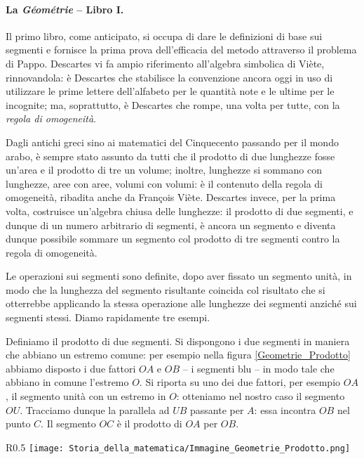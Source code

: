 \paragraph{La \textit{G\'eom\'etrie} -- Libro I.} Il primo libro, come anticipato, si occupa di dare le definizioni di base sui segmenti e fornisce la prima prova dell'efficacia del metodo attraverso il problema di Pappo. Descartes vi fa ampio riferimento all'algebra simbolica di Vi\`ete, rinnovandola: \`e Descartes che stabilisce la convenzione ancora oggi in uso di utilizzare le prime lettere dell'alfabeto per le quantit\`a note e le ultime per le incognite; ma, soprattutto, \`e Descartes che rompe, una volta per tutte, con la \textit{regola di omogeneit\`a}.
\par Dagli antichi greci sino ai matematici del Cinquecento passando per il mondo arabo, \`e sempre stato assunto da tutti che il prodotto di due lunghezze fosse un'area e il prodotto di tre un volume; inoltre, lunghezze si sommano con lunghezze, aree con aree, volumi con volumi: \`e il contenuto della regola di omogeneit\`a, ribadita anche da Fran\c{c}ois Vi\`ete. Descartes invece, per la prima volta, costruisce un'algebra chiusa delle lunghezze: il prodotto di due segmenti, e dunque di un numero arbitrario di segmenti, \`e ancora un segmento e diventa dunque possibile sommare un segmento col prodotto di tre segmenti contro la regola di omogeneit\`a.
\par Le operazioni sui segmenti sono definite, dopo aver fissato un segmento unit\`a, in modo che la lunghezza del segmento risultante coincida col risultato che si otterrebbe applicando la stessa operazione alle lunghezze dei segmenti anzich\'e sui segmenti stessi. Diamo rapidamente tre esempi.
\par Definiamo il prodotto di due segmenti. Si dispongono i due segmenti in maniera che abbiano un estremo comune: per esempio nella figura \ref{Geometrie_Prodotto} abbiamo disposto i due fattori $OA$ e $OB$ -- i segmenti blu -- in modo tale che abbiano in comune l'estremo $O$. Si riporta su uno dei due fattori, per esempio $OA$, il segmento unit\`a con un estremo in $O$: otteniamo nel nostro caso il segmento $OU$. Tracciamo dunque la parallela ad $UB$ passante per $A$: essa incontra $OB$ nel punto $C$. Il segmento $OC$ \`e il prodotto di $OA$ per $OB$.
\begin{wrapfigure}{R}{0.5\textwidth}
	\texttt{[image: Storia\_della\_matematica/Immagine\_Geometrie\_Prodotto.png]}
	\caption{Definizione del prodotto di due segmenti.}
	\label{Geometrie_Prodotto}
\end{wrapfigure}
